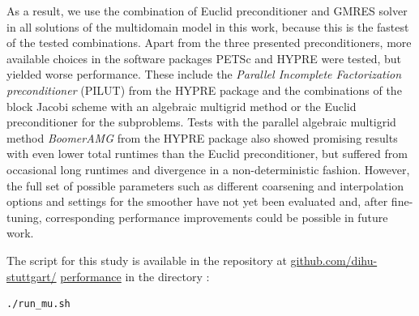 As a result, we use the combination of Euclid preconditioner and GMRES solver in all solutions of the multidomain model in this work, because this is the fastest of the tested combinations. Apart from the three presented preconditioners, more available choices in the software packages PETSc and HYPRE were tested, but yielded worse performance. These include the \emph{Parallel Incomplete Factorization preconditioner} (PILUT) from the HYPRE package and the combinations of the block Jacobi scheme with an algebraic multigrid method or the Euclid preconditioner for the subproblems. Tests with the parallel algebraic multigrid method \emph{BoomerAMG} from the HYPRE package also showed promising results with even lower total runtimes than the Euclid preconditioner, but suffered from occasional long runtimes and divergence in a non-deterministic fashion. However, the full set of possible parameters such as different coarsening and interpolation options and settings for the smoother have not yet been evaluated and, after fine-tuning, corresponding performance improvements could be possible in future work.

\begin{reproduce_no_break}
  The script for this study is available in the repository at \href{https://github.com/dihu-stuttgart/performance}{github.com/dihu-stuttgart/} \href{https://github.com/dihu-stuttgart/performance}{performance} in the directory :
  \begin{lstlisting}[columns=fullflexible,breaklines=true,postbreak=\mbox{\textcolor{gray}{$\hookrightarrow$}\space}]
    ./run_mu.sh
  \end{lstlisting}
\end{reproduce_no_break}

